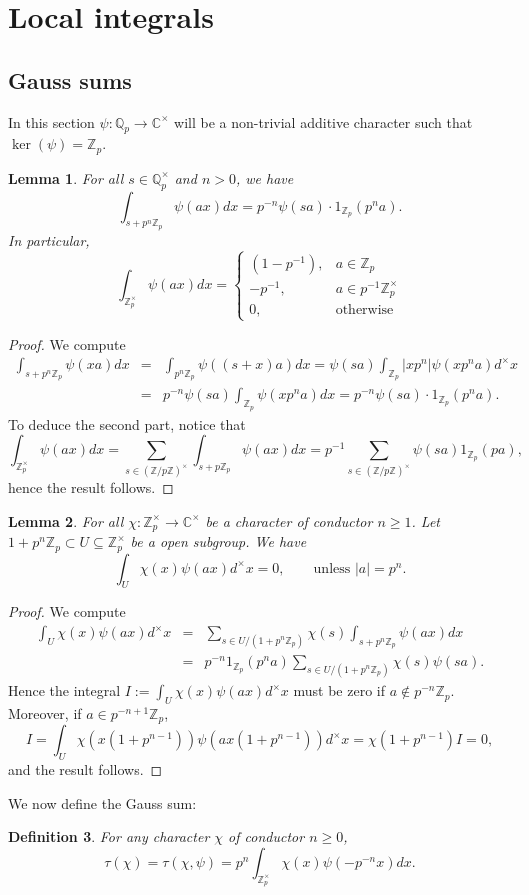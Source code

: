 \documentclass{amsart}
\newtheorem{defn0}{Definition}[section]
\newtheorem{lemma0}[defn0]{Lemma}
\newenvironment{definition}{\begin{defn0}\rm}{\end{defn0}}
\newenvironment{lemma}{\begin{lemma0}}{\end{lemma0}}
\newcommand{\Z}{{\mathbb Z}}
\newcommand{\Q}{{\mathbb Q}}
\newcommand{\C}{{\mathbb C}}
\begin{document}
\section{Local integrals}

\subsection{Gauss sums}

In this section $\psi:\Q_p\rightarrow\C^\times$ will be a non-trivial additive character such that $\ker(\psi)=\Z_p$.

\begin{lemma}\label{intpsi}
For all $s\in\Q_p^\times$ and $n>0$, we have
\[
\int_{s+p^n\Z_p}\psi(ax)dx=p^{-n}\psi(sa)\cdot1_{\Z_p}(p^na).
\]
In particular,
\[
\int_{\Z_p^\times}\psi(ax)dx=\left\{\begin{array}{ll}(1-p^{-1}),&a\in\Z_p\\-p^{-1},&a\in p^{-1}\Z_p^\times\\0,&\mbox{otherwise}\end{array}\right.
\]
\end{lemma}
\begin{proof}
We compute
\begin{eqnarray*}
\int_{s+p^n\Z_p}\psi(xa)d x&=&\int_{p^n\Z_p}\psi((s+x)a)d x=\psi(sa)\int_{\Z_p}|xp^n|\psi(xp^na)d^\times x\\
&=&p^{-n}\psi(sa)\int_{\Z_p}\psi(xp^na)d x=p^{-n}\psi(sa)\cdot1_{\Z_p}(p^na).
\end{eqnarray*}
To deduce the second part, notice that
\[
\int_{\Z_p^\times}\psi(ax)dx=\sum_{s\in(\Z/p\Z)^\times}\int_{s+p\Z_p}\psi(ax)dx=p^{-1}\sum_{s\in(\Z/p\Z)^\times}\psi(sa)1_{\Z_p}(pa),
\]
hence the result follows.
\end{proof}
\begin{lemma}\label{psichi}
For all $\chi:\Z_p^\times\rightarrow\C^\times$ be a character of conductor $n\geq 1$. Let $1+p^n\Z_p\subset U\subseteq \Z_p^\times$ be a open subgroup. We have
\[
\int_{U}\chi(x)\psi(ax)d^\times x=0,\qquad\mbox{unless $|a|=p^n$.}
\]
\end{lemma}
\begin{proof}
We compute
\begin{eqnarray*}
\int_{U}\chi(x)\psi(ax)d^\times x&=&\sum_{s\in U/(1+p^n\Z_p)}\chi(s)\int_{s+p^n\Z_p}\psi(ax)d x\\
&=&p^{-n}1_{\Z_p}(p^na)\sum_{s\in U/(1+p^n\Z_p)}\chi(s)\psi(sa).
\end{eqnarray*}
Hence the integral $I:=\int_{U}\chi(x)\psi(ax)d^\times x$ must be zero if $a\not\in p^{-n}\Z_p$. Moreover, if $a\in p^{-n+1}\Z_p$,
\[
I=\int_{U}\chi(x(1+p^{n-1}))\psi(ax(1+p^{n-1}))d^\times x=\chi(1+p^{n-1})I=0,
\]
and the result follows.
\end{proof}
We now define the Gauss sum:
\begin{definition}\label{defGS}
For any character $\chi$ of conductor $n\geq 0$, 
\[
\tau(\chi)=\tau(\chi,\psi)=p^n\int_{\Z_p^\times}\chi(x)\psi(-p^{-n}x)dx.
\]
\end{definition}
\end{document}
